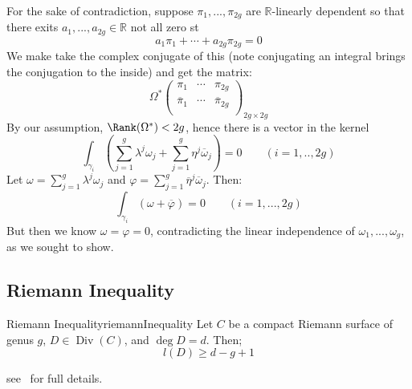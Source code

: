 \documentclass{book}
\newcommand{\R}{{\mathbb{R}}}
\newcommand{\Div}{{\operatorname{Div}}}
\newcommand{\oln}[1]{{\overline{#1}}}
\let\temp\phi
\let\phi\varphi
\let\varphi\temp
\begin{document}
\begin{Proof}
  For the sake of contradiction, suppose $\pi_1, ..., \pi_{2g}$ are $\R$-linearly dependent so that there
  exits $a_1, ..., a_{2g} \in \R$ not all zero st
  \[
    a_1\pi_1 + \cdots + a_{2g}\pi_{2g} = 0
  \]
  We make take the complex conjugate of this  (note conjugating an integral brings the conjugation to the
  inside) and get the matrix:
  \[
    \Omega^* \begin{pmatrix}
      \pi_1 & \cdots & \pi_{2g}\\
      \overline{\pi}_1 & \cdots & \overline{\pi}_{2g}\\
    \end{pmatrix}_{2g\times 2g}
  \]
  By our assumption, $\Rank(\Omega^*) < 2g$, hence there is a vector in the kernel
  \[
    \int_{\gamma_i} \left(\sum_{j=1}^g \lambda^j\omega_j + \sum_{j=1}^g \eta^j \overline{\omega}_j\right)
    = 0 \qquad (i = 1, .., 2g)
  \]
  Let $\omega = \sum_{j=1}^g \lambda^j\omega_j$ and $\phi = \sum_{j=1}^g \oln{\eta}^j \overline{\omega}_j$.
  Then:
  \[
    \int_{\gamma_i} (\omega + \overline{\phi}) = 0 \qquad (i = 1,..., 2g)
  \]
  But then we know $\omega = \phi = 0$, contradicting the linear independence of $\omega_1, ..., \omega_g$,
  as we sought to show.
\end{Proof}




\subsection{Riemann Inequality}

\begin{thm}{Riemann Inequality}{riemannInequality}
  Let $C$ be a compact Riemann surface of genus $g$, $D \in \Div(C)$, and $\deg D = d$. Then;
  \[
    l(D) \ge d-g+1
  \]
\end{thm}

see~\cite[p.113]{a.griffithsIntroductionAlgebraicCurves} for full details.
\end{document}
